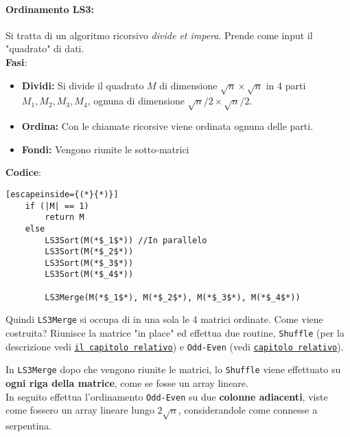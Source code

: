 \paragraph{Ordinamento LS3:} Si tratta di un algoritmo ricorsivo \textit{divide et impera}. Prende come input il "quadrato" di dati.\\

\textbf{Fasi}: 
\begin{itemize}
	\item \textbf{Dividi:} Si divide il quadrato $M$ di dimensione $\sqrt{n} \times \sqrt{n}$ in 4 parti $M_1, M_2, M_3, M_4$, ognuna di dimensione $\sqrt{n}/2 \times \sqrt{n}/2$.\\
	
	\item \textbf{Ordina:} Con le chiamate ricorsive viene ordinata ognuna delle parti.\\
	
	\item \textbf{Fondi:} Vengono riunite le sotto-matrici
\end{itemize}

\textbf{Codice}: 

\begin{lstlisting}[escapeinside={(*}{*)}]
	if (|M| == 1)
		return M
	else 
		LS3Sort(M(*$_1$*)) //In parallelo
		LS3Sort(M(*$_2$*))
		LS3Sort(M(*$_3$*))
		LS3Sort(M(*$_4$*))
		
		LS3Merge(M(*$_1$*), M(*$_2$*), M(*$_3$*), M(*$_4$*))
\end{lstlisting}

Quindi \texttt{LS3Merge} si occupa di in una sola le 4 matrici ordinate. Come viene costruita? Riunisce la matrice "in place" ed effettua due routine, \texttt{Shuffle} (per la descrizione vedi \hyperref[subsec:shuffle]{\texttt{il capitolo relativo}}) e \texttt{Odd-Even} (vedi \hyperref[subsec:ordinamento]{\texttt{capitolo relativo}}).\\

\newpage

In \texttt{LS3Merge} dopo che vengono riunite le matrici, lo \texttt{Shuffle} viene effettuato su \textbf{ogni riga della matrice}, come se fosse un array lineare.\\

In seguito effettua l'ordinamento \texttt{Odd-Even} su due \textbf{colonne adiacenti}, viste come fossero un array lineare lungo $2 \sqrt{n}$, considerandole come connesse a serpentina.\\


